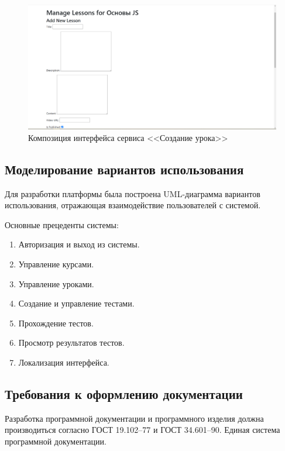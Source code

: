 \begin{figure}[ht]
	\centering
	\includegraphics[width=1\linewidth]{images/создатьурок}
	\caption{Композиция интерфейса сервиса <<Создание урока>>}
	\label{templ:image10}
\end{figure}

\clearpage
\subsection{Моделирование вариантов использования}

Для разработки платформы была построена UML-диаграмма вариантов использования, отражающая взаимодействие пользователей с системой.

Основные прецеденты системы:
\begin{enumerate}
\item Авторизация и выход из системы.
\item Управление курсами.
\item Управление уроками.
\item Создание и управление тестами.
\item Прохождение тестов.
\item Просмотр результатов тестов.
\item Локализация интерфейса.

\end{enumerate}

\subsection{Требования к оформлению документации}

Разработка программной документации и программного изделия должна производиться согласно ГОСТ 19.102–77 и ГОСТ 34.601–90. Единая система программной документации.
